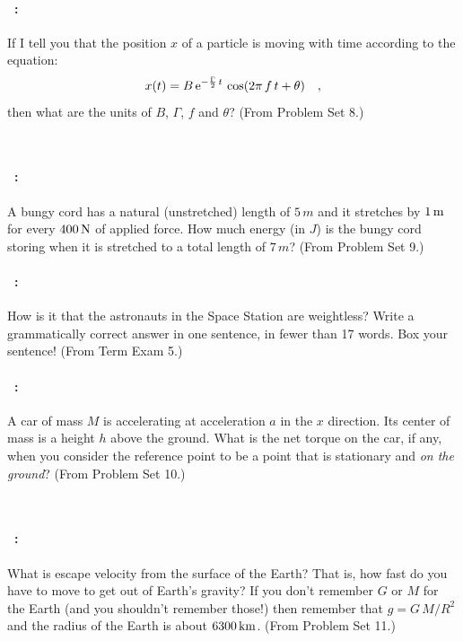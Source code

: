 \documentclass[12pt]{article} 
\begin{document}
\vfill

\paragraph{\problemname~\theproblem:}%
If I tell you that the position $x$ of a particle is moving with
time according to the equation:
\begin{equation}
x(t) = B\,\mathrm{e}^{-\frac{\Gamma}{2}\,t}\,\cos (2\pi\,f\,t + \theta)
\quad ,
\end{equation}
then what are the units of $B$, $\Gamma$, $f$ and $\theta$?
(From Problem Set 8.)

\vfill
~
\clearpage

\paragraph{\problemname~\theproblem:}%
A bungy cord has a natural (unstretched) length of $5\,m$ and it
stretches by $1\,\mathrm{m}$ for every $400\,\mathrm{N}$ of applied force. How much
energy (in $J$) is the bungy cord storing when it is stretched to
a total length of $7\,m$?
(From Problem Set 9.)

\vfill

\paragraph{\problemname~\theproblem:}%
How is it that the astronauts in the Space Station are weightless?
Write a grammatically correct answer in one sentence, in fewer than 17
words.  Box your sentence!
(From Term Exam 5.)

\vfill

\paragraph{\problemname~\theproblem:}%
A car of mass $M$ is accelerating at acceleration $a$ in the $x$
direction. Its center of mass is a height $h$ above the ground.  What
is the net torque on the car, if any, when you consider the reference point to be
a point that is stationary and \emph{on the ground}?
(From Problem Set 10.)

\vfill
~
\clearpage

\paragraph{\problemname~\theproblem:}%
What is escape velocity from the surface of the Earth? That is, how
fast do you have to move to get out of Earth's gravity?
If you don't remember $G$ or $M$ for the Earth (and you shouldn't remember
those!) then remember that $g = G\,M/R^2$ and the radius of the Earth is
about $6300\,\mathrm{km}$.
(From Problem Set 11.)
\end{document}
